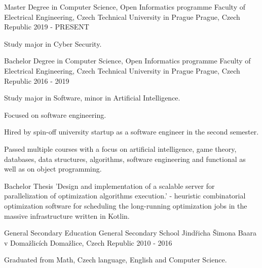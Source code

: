 
\begin{cventries}
	\cventry
	{Master Degree in Computer Science, Open Informatics programme}
	{Faculty of Electrical Engineering, Czech Technical University in Prague}
	{Prague, Czech Republic}
	{2019 - PRESENT}
	{
		\begin{cvitems}
			\item {Study major in Cyber Security.}
		\end{cvitems}
	}

	\cventry
	{Bachelor Degree in Computer Science, Open Informatics programme}
	{Faculty of Electrical Engineering, Czech Technical University in Prague}
	{Prague, Czech Republic}
	{2016 - 2019}
	{
		\begin{cvitems}
			\item {Study major in Software, minor in Artificial Intelligence.}
			\item {Focused on software engineering.}
			\item {Hired by spin-off university startup as a software engineer in the second semester.}
			\item {Passed multiple courses with a focus on artificial intelligence, game theory, databases,
			data structures, algorithms, software engineering and functional as well as on object programming.}
			 \item {Bachelor Thesis 'Design and implementation of a scalable server for parallelization of optimization algorithms execution.'
             - heuristic combinatorial optimization software for scheduling the long-running optimization jobs in the massive infrastructure written in Kotlin.}
		\end{cvitems}
	}
		
		
	\cventry
	{General Secondary Education}
	{General Secondary School Jindřicha Šimona Baara v Domažlicích}
	{Domažlice, Czech Republic}
	{2010 - 2016}
	{
		\begin{cvitems}
			\item {Graduated from Math, Czech language, English and Computer Science.}
		\end{cvitems}
	}

\end{cventries}